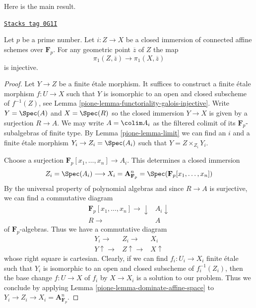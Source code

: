 Here is the main result.

\begin{proposition}[Injective]
\label{pione-proposition-injective}
\href{https://stacks.math.columbia.edu/tag/0G1I}{\texttt{Stacks tag 0G1I}}

Let $p$ be a prime number. Let $i : Z \to X$ be a closed immersion
of connected affine schemes over $\mathbf{F}_p$. For any geometric
point $\overline{z}$ of $Z$ the map
$$
\pi_1(Z, \overline{z}) \to \pi_1(X, \overline{z})
$$
is injective.
\end{proposition}

\begin{proof}

Let $Y \to Z$ be a finite \'etale morphism. It suffices to construct
a finite \'etale morphism $f : U \to X$ such that $Y$ is isomorphic to
an open and closed subscheme of $f^{-1}(Z)$, see
Lemma \ref{pione-lemma-functoriality-galois-injective}.
Write $Y = \Spec(A)$ and $X = \Spec(R)$ so the closed immersion
$Y \to X$ is given by a surjection $R \to A$. We may write
$A = \colim A_i$ as the filtered colimit of its $\mathbf{F}_p$-subalgebras
of finite type. By Lemma \ref{pione-lemma-limit}
we can find an $i$ and a finite \'etale morphism $Y_i \to Z_i = \Spec(A_i)$
such that $Y = Z \times_{Z_i} Y_i$.

\medskip\noindent
Choose a surjection $\mathbf{F}_p[x_1, \ldots, x_n] \to A_i$.
This determines a closed immersion
$$
Z_i = \Spec(A_i)
\longrightarrow
X_i = \mathbf{A}^n_{\mathbf{F}_p} = \Spec(\mathbf{F}_p[x_1, \ldots, x_n])
$$
By the universal property of polynomial algebras and since
$R \to A$ is surjective, we can find a commutative diagram
$$
\begin{array}{cc}\mathbf{F}_p[x_1, \ldots, x_n] \longrightarrow\downarrow & A_i \downarrow \\ R \longrightarrow & A\end{array}
$$
of $\mathbf{F}_p$-algebras. Thus we have a commutative diagram
$$
\begin{array}{ccc}Y_i \longrightarrow & Z_i \longrightarrow & X_i \\ Y \uparrow\longrightarrow & Z \uparrow\longrightarrow & X \uparrow\end{array}
$$
whose right square is cartesian. Clearly, if we can
find $f_i : U_i \to X_i$ finite \'etale such that $Y_i$ is
isomorphic to an open and closed subscheme of $f_i^{-1}(Z_i)$,
then the base change $f : U \to X$ of $f_i$ by $X \to X_i$
is a solution to our problem. Thus we conclude by applying
Lemma \ref{pione-lemma-dominate-affine-space} to
$Y_i \to Z_i \to X_i = \mathbf{A}^n_{\mathbf{F}_p}$.
\end{proof}



